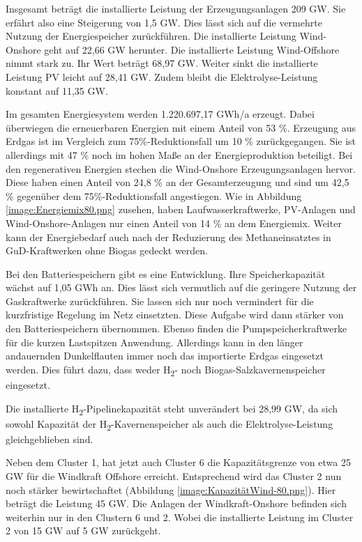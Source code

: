 Insgesamt beträgt die installierte Leistung der Erzeugungsanlagen 209 GW. Sie erfährt also eine Steigerung von 1,5 GW. Dies lässt sich auf die vermehrte Nutzung der Energiespeicher zurückführen. Die installierte Leistung Wind-Onshore geht auf 22,66 GW herunter. Die installierte Leistung Wind-Offshore nimmt stark zu. Ihr Wert beträgt 68,97 GW. Weiter sinkt die installierte Leistung PV leicht auf 28,41 GW. Zudem bleibt die Elektrolyse-Leistung konstant auf 11,35 GW. 


Im gesamten Energiesystem werden 1.220.697,17 GWh/a erzeugt. Dabei überwiegen die erneuerbaren Energien mit einem Anteil von 53 \%. Erzeugung aus Erdgas ist im Vergleich zum 75\%-Reduktionsfall um 10 \% zurückgegangen. Sie ist allerdings mit 47 \% noch im hohen Maße an der Energieproduktion beteiligt. Bei den regenerativen Energien stechen die Wind-Onshore Erzeugungsanlagen hervor. Diese haben einen Anteil von 24,8 \% an der Gesamterzeugung und sind um 42,5 \% gegenüber dem 75\%-Reduktionsfall angestiegen. Wie in Abbildung \ref{image:Energiemix80.png} zusehen, haben Laufwasserkraftwerke, PV-Anlagen und Wind-Onshore-Anlagen nur einen Anteil von 14 \% an dem Energiemix. Weiter kann der Energiebedarf auch nach der Reduzierung des Methaneinsatztes in GuD-Kraftwerken ohne Biogas gedeckt werden. 


Bei den Batteriespeichern gibt es eine Entwicklung. Ihre Speicherkapazität wächst auf 1,05 GWh an. Dies lässt sich vermutlich auf die geringere Nutzung der Gaskraftwerke zurückführen. Sie lassen sich nur noch vermindert für die kurzfristige Regelung im Netz einsetzten. Diese Aufgabe wird dann stärker von den Batteriespeichern übernommen. Ebenso finden die Pumpspeicherkraftwerke für die kurzen Lastspitzen Anwendung. Allerdings kann in den länger andauernden Dunkelflauten immer noch das importierte Erdgas eingesetzt werden. Dies führt dazu, dass weder H\textsubscript{2}- noch Biogas-Salzkavernenspeicher eingesetzt.

Die installierte H\textsubscript{2}-Pipelinekapazität steht unverändert bei 28,99 GW, da sich sowohl Kapazität der H\textsubscript{2}-Kavernenspeicher als auch die Elektrolyse-Leistung gleichgeblieben sind.


Neben dem Cluster 1, hat jetzt auch Cluster 6 die Kapazitätsgrenze von etwa 25 GW für die Windkraft Offshore erreicht. Entsprechend wird das Cluster 2 nun noch stärker bewirtschaftet (Abbildung \ref{image:KapazitätWind-80.png}). Hier beträgt die Leistung 45 GW. Die Anlagen der Windkraft-Onshore befinden sich weiterhin nur in den Clustern 6 und 2. Wobei die installierte Leistung im Cluster 2 von 15 GW auf 5 GW zurückgeht. 

